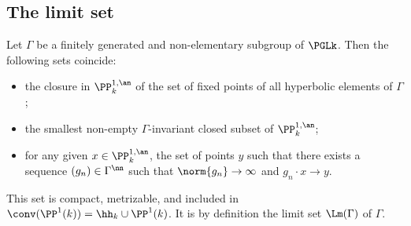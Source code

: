 \subsection{The limit set}

\begin{theo}\label{thm:struct limit}
Let $\Gamma$ be a finitely generated and non-elementary subgroup of $\PGLk$. Then the following sets coincide:
\begin{itemize}
\item the closure in $\PP^{1,\an}_k$ of the set of fixed points of all hyperbolic elements of $\Gamma$;
\item the smallest non-empty $\Gamma$-invariant closed subset of $\PP^{1,\an}_k$;
\item for any given $x\in \PP^{1,\an}_k$, the set of points $y$ such that there exists a sequence $(g_n)\in \Gamma^\nn$ such that $\norm{g_n}\to\infty$ and $g_n \cdot x \to y$.
\end{itemize}
This set is compact, metrizable, and included in $\conv(\PP^1(k)) =\hh_k \cup \PP^1(k)$. It is by definition the limit set $\Lm(\Gamma)$ of $\Gamma$.
\end{theo}

